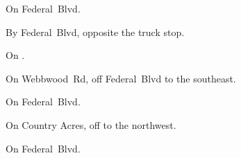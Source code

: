 
\begin{LocationList}

On   Federal~Blvd.

By  Federal~Blvd, opposite the truck stop.

On  .

On Webbwood~Rd, off   Federal~Blvd to the southeast.

On   Federal~Blvd.

On Country Acres, off   to the northwest.

\Location{\TruckStop \Gas \Rest \Service}
On  Federal~Blvd.

\end{LocationList}
